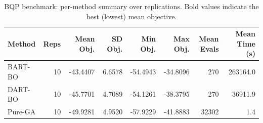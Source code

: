 \begin{table}[ht]
\centering
\caption{BQP benchmark: per-method summary over replications.
             Bold values indicate the best (lowest) mean objective.} 
\label{tab:bqp_summary}
\begin{tabular}{lrrrrrrr}
  \toprule
Method & Reps & Mean Obj. & SD Obj. & Min Obj. & Max Obj. & Mean Evals & Mean Time (s) \\ 
  \midrule
BART-BO & 10 & -43.4407 & 6.6578 & -54.4943 & -34.8096 & 270 & 263164.0 \\ 
  DART-BO & 10 & -45.7701 & 4.7089 & -54.1261 & -38.3795 & 270 & 36911.9 \\ 
   \rowcolor{gray!15}Pure-GA & 10 & -49.9281 & 4.9520 & -57.9229 & -41.8883 & 32302 & 1.4 \\ 
   \bottomrule
\end{tabular}
\end{table}
